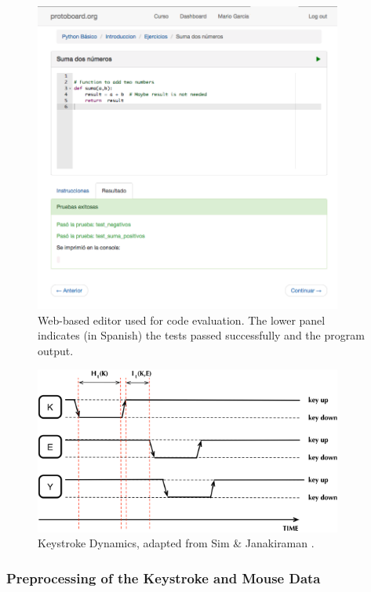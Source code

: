 \documentclass[a4paper,twoside]{article}
\begin{document}
\begin{figure}[h!tb] 
\centering 
\includegraphics[width=0.9\textwidth]{editorRresult.png} 
\caption{Web-based editor used for code evaluation. The lower panel
  indicates (in Spanish) the tests passed successfully and the program
  output.}
\label{fig_editor} 
\end{figure}

\begin{figure}[h!tb] 
\centering 
\includegraphics[width=0.9\textwidth]{KeyDyn.png} 
\caption{Keystroke Dynamics, adapted from Sim \& Janakiraman \cite{sim2007digraphs}.}
\label{figKD} 
\end{figure}

\subsubsection{Preprocessing of the Keystroke and Mouse Data} 
\end{document}
